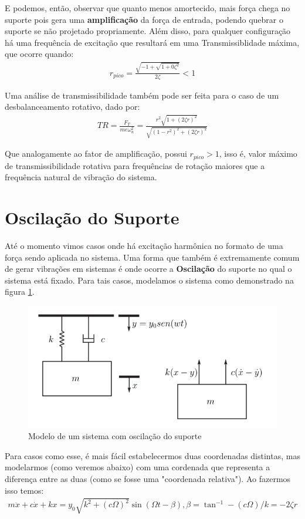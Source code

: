 \documentclass{article}
\begin{document}
E podemos, então, observar que quanto menos amortecido, mais força chega no suporte pois gera uma \textbf{amplificação} da força de entrada, podendo quebrar o suporte se não projetado
propriamente. Além disso, para qualquer configuração há uma frequência de excitação que resultará em uma Transmissiblidade máxima, que ocorre quando:
\begin{align}
    r_{pico} = \frac{\sqrt{-1 + \sqrt{1 + 0 \zeta ^2}}}{2 \zeta} < 1
\end{align}

Uma análise de transmissibilidade também pode ser feita para o caso de um desbalanceamento rotativo, dado por:
\begin{align}
    TR = \frac{F_T}{me\omega_n^2} = \frac{r^2\sqrt{1 + (2\zeta r)^2}}{\sqrt{(1 - r^2)^2 + (2\zeta r)^2}}
\end{align}

Que analogamente ao fator de amplificação,  possui $r_{pico} > 1$, isso é, valor máximo de transmissibilidade rotativa para frequências de rotação maiores que a frequência natural de
vibração do sistema.

\section{Oscilação do Suporte}
Até o momento vimos casos onde há excitação harmônica no formato de uma força sendo aplicada no sistema. Uma forma que também é extremamente comum de gerar vibrações em sistemas é onde
ocorre a \textbf{Oscilação} do suporte no qual o sistema está fixado. Para tais casos, modelamos o sistema como demonstrado na figura \ref{fig:osci_suporte}.

\begin{figure}[h]
    \centering
    \includegraphics[width=.5\textwidth]{imgs/osci_suporte.png}
    \caption{Modelo de um sistema com oscilação do suporte}
    \label{fig:osci_suporte}
\end{figure}


Para casos como esse, é mais fácil estabelecermos duas coordenadas distintas, mas modelarmos (como veremos abaixo) com uma cordenada que representa a diferença entre as duas (como se fosse
uma "coordenada relativa"). Ao fazermos isso temos:
\begin{align}
    m\ddot x + c \dot x + kx = y_0\sqrt{k^2 + (c\Omega)^2}\sin{(\Omega t - \beta)}, \beta = \tan^{-1}-(c\Omega)/k = -2\zeta r
\end{align}
\end{document}
